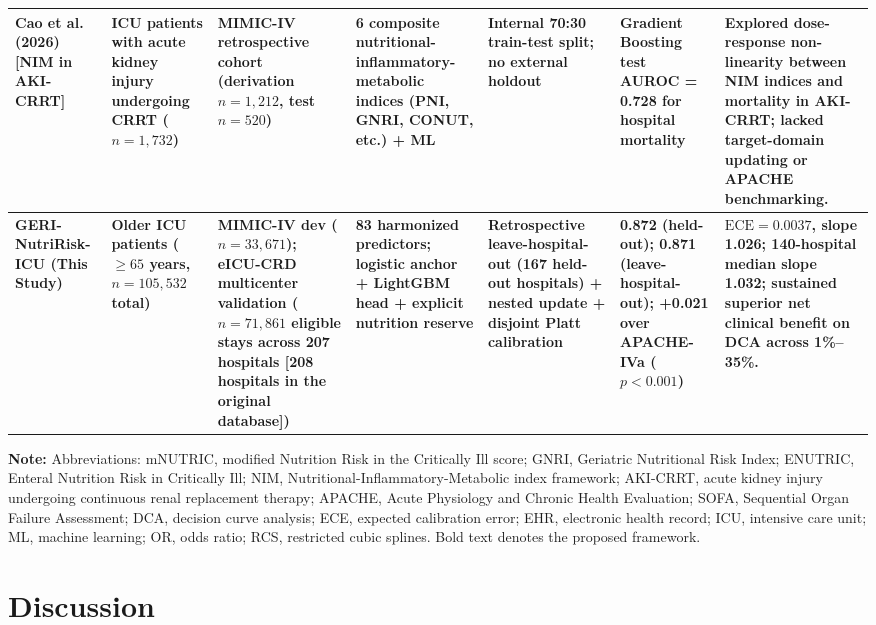 \documentclass[utf8]{FrontiersinVancouver}
\begin{document}
\begin{table}[htbp]
{\begin{tabular}{p{2.6cm}p{2.8cm}p{2.6cm}p{3.2cm}p{2.8cm}p{2.2cm}p{2.8cm}}
\addlinespace
Cao et al. (2026) [NIM in AKI-CRRT] & ICU patients with acute kidney injury undergoing CRRT ($n=1{,}732$) & MIMIC-IV retrospective cohort (derivation $n=1{,}212$, test $n=520$) & 6 composite nutritional-inflammatory-metabolic indices (PNI, GNRI, CONUT, etc.) + ML & Internal 70:30 train-test split; no external holdout & Gradient Boosting test AUROC = 0.728 for hospital mortality & Explored dose-response non-linearity between NIM indices and mortality in AKI-CRRT; lacked target-domain updating or APACHE benchmarking.\\
\midrule
\textbf{GERI-NutriRisk-ICU (This Study)} & \textbf{Older ICU patients ($\ge 65$ years, $n=105{,}532$ total)} & \textbf{MIMIC-IV dev ($n=33{,}671$); eICU-CRD multicenter validation ($n=71{,}861$ eligible stays across 207 hospitals [208 hospitals in the original database])} & \textbf{83 harmonized predictors; logistic anchor + LightGBM head + explicit nutrition reserve} & \textbf{Retrospective leave-hospital-out (167 held-out hospitals) + nested update + disjoint Platt calibration} & \textbf{0.872 (held-out); 0.871 (leave-hospital-out); +0.021 over APACHE-IVa ($p<0.001$)} & \textbf{$\text{ECE}=0.0037$, slope 1.026; 140-hospital median slope 1.032; sustained superior net clinical benefit on DCA across 1\%--35\%.}\\
\bottomrule
\end{tabular}}
\begin{flushleft}
\footnotesize
\textbf{Note:} Abbreviations: mNUTRIC, modified Nutrition Risk in the Critically Ill score; GNRI, Geriatric Nutritional Risk Index; ENUTRIC, Enteral Nutrition Risk in Critically Ill; NIM, Nutritional-Inflammatory-Metabolic index framework; AKI-CRRT, acute kidney injury undergoing continuous renal replacement therapy; APACHE, Acute Physiology and Chronic Health Evaluation; SOFA, Sequential Organ Failure Assessment; DCA, decision curve analysis; ECE, expected calibration error; EHR, electronic health record; ICU, intensive care unit; ML, machine learning; OR, odds ratio; RCS, restricted cubic splines. Bold text denotes the proposed framework.
\end{flushleft}
\end{table}

\section{Discussion}
\end{document}
